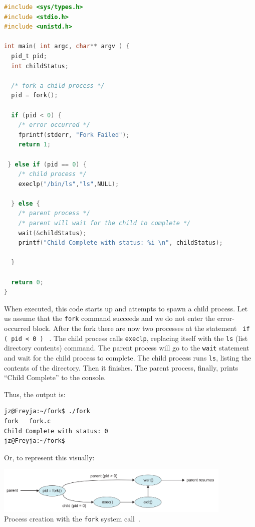 \begin{lstlisting}[language=C]
#include <sys/types.h>
#include <stdio.h> 
#include <unistd.h>

int main( int argc, char** argv ) {
  pid_t pid;
  int childStatus;

  /* fork a child process */
  pid = fork();
  
  if (pid < 0) { 
    /* error occurred */ 
    fprintf(stderr, "Fork Failed"); 
    return 1;
  
 } else if (pid == 0) {    
    /* child process */
    execlp("/bin/ls","ls",NULL);
    
  } else {    
    /* parent process */
    /* parent will wait for the child to complete */
    wait(&childStatus);
    printf("Child Complete with status: %i \n", childStatus);
    
  }
    
  return 0;
}
\end{lstlisting}

When executed, this code starts up and attempts to spawn a child process. Let us assume that the \texttt{fork} command succeeds and we do not enter the error-occurred block.  After the fork there are now two processes at the statement \texttt{ if ( pid < 0 ) } . The child process calls \texttt{execlp}, replacing itself with the \texttt{ls} (list directory contents) command. The parent process will go to the \texttt{wait} statement and wait for the child process to complete. The child process runs \texttt{ls}, listing the contents of the directory. Then it finishes. The parent process, finally, prints ``Child Complete'' to the console.

Thus, the output is:
\begin{verbatim}
jz@Freyja:~/fork$ ./fork 
fork   fork.c
Child Complete with status: 0
jz@Freyja:~/fork$ 
\end{verbatim}

Or, to represent this visually:

\begin{center}
	\includegraphics[width=0.85\textwidth]{images/fork-syscall.png}\\
	Process creation with the \texttt{fork} system call~\cite{osc}.
\end{center}

